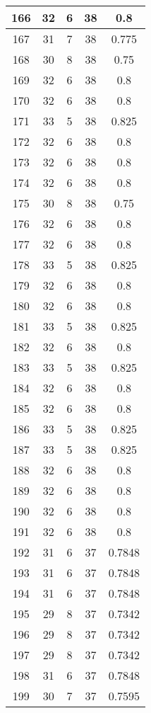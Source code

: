 \documentclass[letterpaper, 12pt]{article}
\begin{document}
\begin{longtable}{|c|c|c|c|c|}
\hline
166 & 32 & 6 & 38 & 0.8 \\
\hline
167 & 31 & 7 & 38 & 0.775 \\
\hline
168 & 30 & 8 & 38 & 0.75 \\
\hline
169 & 32 & 6 & 38 & 0.8 \\
\hline
170 & 32 & 6 & 38 & 0.8 \\
\hline
171 & 33 & 5 & 38 & 0.825 \\
\hline
172 & 32 & 6 & 38 & 0.8 \\
\hline
173 & 32 & 6 & 38 & 0.8 \\
\hline
174 & 32 & 6 & 38 & 0.8 \\
\hline
175 & 30 & 8 & 38 & 0.75 \\
\hline
176 & 32 & 6 & 38 & 0.8 \\
\hline
177 & 32 & 6 & 38 & 0.8 \\
\hline
178 & 33 & 5 & 38 & 0.825 \\
\hline
179 & 32 & 6 & 38 & 0.8 \\
\hline
180 & 32 & 6 & 38 & 0.8 \\
\hline
181 & 33 & 5 & 38 & 0.825 \\
\hline
182 & 32 & 6 & 38 & 0.8 \\
\hline
183 & 33 & 5 & 38 & 0.825 \\
\hline
184 & 32 & 6 & 38 & 0.8 \\
\hline
185 & 32 & 6 & 38 & 0.8 \\
\hline
186 & 33 & 5 & 38 & 0.825 \\
\hline
187 & 33 & 5 & 38 & 0.825 \\
\hline
188 & 32 & 6 & 38 & 0.8 \\
\hline
189 & 32 & 6 & 38 & 0.8 \\
\hline
190 & 32 & 6 & 38 & 0.8 \\
\hline
191 & 32 & 6 & 38 & 0.8 \\
\hline
192 & 31 & 6 & 37 & 0.7848 \\
\hline
193 & 31 & 6 & 37 & 0.7848 \\
\hline
194 & 31 & 6 & 37 & 0.7848 \\
\hline
195 & 29 & 8 & 37 & 0.7342 \\
\hline
196 & 29 & 8 & 37 & 0.7342 \\
\hline
197 & 29 & 8 & 37 & 0.7342 \\
\hline
198 & 31 & 6 & 37 & 0.7848 \\
\hline
199 & 30 & 7 & 37 & 0.7595 \\
\hline
\end{longtable}
\end{document}
